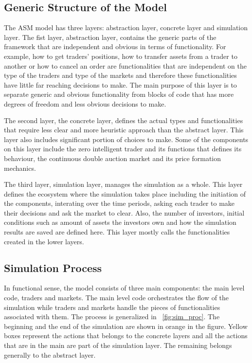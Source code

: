 \subsection{Generic Structure of the Model}
The ASM model has three layers: abstraction layer, concrete 
layer and simulation layer. The fist layer, abstraction layer, contains the 
generic parts of the framework that are independent and obvious in terms
of functionality. For example, how to get traders' positions, how to
transfer assets from a trader to another or how to cancel an order are
functionalities that are independent on the type of the traders 
and type of the markets and therefore these functionalities have little
far reaching decisions to make. The main purpose of this layer
is to separate generic and obvious functionality from blocks of code
that has more degrees of freedom and less obvious decisions to make.

The second layer, the concrete layer, defines the actual types and
functionalities that require less clear and more heuristic
approach than the abstract layer. This layer also includes significant
portion of choices to make. Some of the components
on this layer include the zero intelligent trader and its
functions that defines its behaviour, the continuous double auction
market and its price formation mechanics.

The third layer, simulation layer, manages the simulation as a whole.
This layer defines the ecosystem where the simulation takes place including
the initiation of the components, interating over the time periods, asking
each trader to make their decisions and ask the market to clear. 
Also, the number of investors, initial conditions such as amount of assets 
the investors own and how the simulation results are saved are defined here. 
This layer mostly calls the functionalities created in the lower layers.



\subsection{Simulation Process}
In functional sense, the model consists of three main components:
the main level code, traders and markets. The main level code 
orchestrates the flow of the simulation while traders and markets
handle the pieces of functionalities associated with them. The process
is generalized in ~\ref{fig:sim_proc}. The beginning and the end of the 
simulation are shown in orange in the figure. Yellow boxes represent
the actions that belongs to the concrete layers and all the actions that
are in the main are part of the simulation layer. The remaining belongs
generally to the abstract layer.


